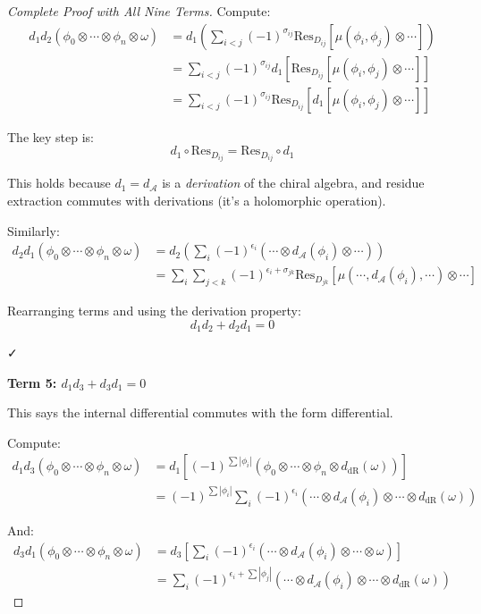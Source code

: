 \begin{proof}[Complete Proof with All Nine Terms]
Compute:
\begin{align*}
d_1 d_2(\phi_0 \otimes \cdots \otimes \phi_n \otimes \omega) &= d_1\left(\sum_{i<j} (-1)^{\sigma_{ij}} \text{Res}_{D_{ij}}[\mu(\phi_i, \phi_j) \otimes \cdots]\right) \\
&= \sum_{i<j} (-1)^{\sigma_{ij}} d_1[\text{Res}_{D_{ij}}[\mu(\phi_i, \phi_j) \otimes \cdots]] \\
&= \sum_{i<j} (-1)^{\sigma_{ij}} \text{Res}_{D_{ij}}[d_1[\mu(\phi_i, \phi_j) \otimes \cdots]]
\end{align*}

The key step is:
$$d_1 \circ \text{Res}_{D_{ij}} = \text{Res}_{D_{ij}} \circ d_1$$

This holds because $d_1 = d_\mathcal{A}$ is a \emph{derivation} of the chiral algebra, and residue extraction commutes with derivations (it's a holomorphic operation).

Similarly:
\begin{align*}
d_2 d_1(\phi_0 \otimes \cdots \otimes \phi_n \otimes \omega) &= d_2\left(\sum_i (-1)^{\epsilon_i} (\cdots \otimes d_\mathcal{A}(\phi_i) \otimes \cdots)\right) \\
&= \sum_i \sum_{j<k} (-1)^{\epsilon_i + \sigma_{jk}} \text{Res}_{D_{jk}}[\mu(\cdots, d_\mathcal{A}(\phi_i), \cdots) \otimes \cdots]
\end{align*}

Rearranging terms and using the derivation property:
$$d_1 d_2 + d_2 d_1 = 0$$

✓

\medskip
\noindent\textbf{Term 5: $d_1 d_3 + d_3 d_1 = 0$}

This says the internal differential commutes with the form differential.

Compute:
\begin{align*}
d_1 d_3(\phi_0 \otimes \cdots \otimes \phi_n \otimes \omega) &= d_1[(-1)^{\sum |\phi_i|} (\phi_0 \otimes \cdots \otimes \phi_n \otimes d_{\text{dR}}(\omega))] \\
&= (-1)^{\sum |\phi_i|} \sum_i (-1)^{\epsilon_i} (\cdots \otimes d_\mathcal{A}(\phi_i) \otimes \cdots \otimes d_{\text{dR}}(\omega))
\end{align*}

And:
\begin{align*}
d_3 d_1(\phi_0 \otimes \cdots \otimes \phi_n \otimes \omega) &= d_3\left[\sum_i (-1)^{\epsilon_i} (\cdots \otimes d_\mathcal{A}(\phi_i) \otimes \cdots \otimes \omega)\right] \\
&= \sum_i (-1)^{\epsilon_i + \sum |\phi_j|} (\cdots \otimes d_\mathcal{A}(\phi_i) \otimes \cdots \otimes d_{\text{dR}}(\omega))
\end{align*}


\end{proof}
